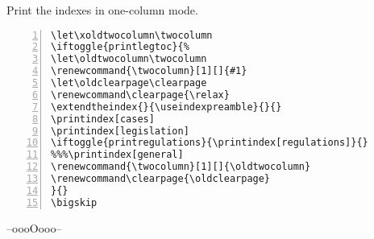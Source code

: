 \p Print the indexes in one-column mode.
             
\bigskip
\begin{mdframed}[backgroundcolor=green!40!yellow!12]
\begin{Verbatim}[numbers=left,numbersep=2pt]
\let\xoldtwocolumn\twocolumn
\iftoggle{printlegtoc}{%
\let\oldtwocolumn\twocolumn
\renewcommand{\twocolumn}[1][]{#1}
\let\oldclearpage\clearpage
\renewcommand\clearpage{\relax}
\extendtheindex{}{\useindexpreamble}{}{}
\printindex[cases]
\printindex[legislation]
\iftoggle{printregulations}{\printindex[regulations]}{}
%%%\printindex[general]
\renewcommand{\twocolumn}[1][]{\oldtwocolumn}
\renewcommand\clearpage{\oldclearpage}
}{}
\bigskip
\end{Verbatim}

\end{mdframed}



\bigskip
\bigskip
\hfill --oooOooo--\hfill\ 

\printbibliography[type=book]







